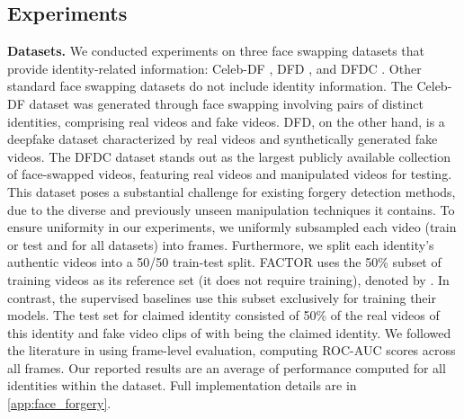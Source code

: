 \documentclass{article} \usepackage{iclr2024_conference,times}
\begin{document}
\vspace{-2em}
\subsection{Experiments}
\textbf{Datasets.} We conducted experiments on three face swapping datasets that provide identity-related information: Celeb-DF \citep{celeb_df}, DFD \citep{dfd}, and DFDC \citep{dfdc}. Other standard face swapping datasets do not include identity information. The Celeb-DF dataset was generated through face swapping involving  pairs of distinct identities, comprising  real videos and  fake videos. DFD, on the other hand, is a deepfake dataset characterized by  real videos and  synthetically generated fake videos. The DFDC dataset stands out as the largest publicly available collection of face-swapped videos, featuring  real videos and  manipulated videos for testing. This dataset poses a substantial challenge for existing forgery detection methods, due to the diverse and previously unseen manipulation techniques it contains. To ensure uniformity in our experiments, we uniformly subsampled each video (train or test and for all datasets) into  frames. Furthermore, we split each identity's authentic videos into a 50/50 train-test split. FACTOR uses the 50\% subset of training videos as its reference set (it does not require training), denoted by . In contrast, the supervised baselines use this subset exclusively for training their models. The test set for claimed identity  consisted of 50\% of the real videos of this identity and fake video clips of with  being the claimed identity. We followed the literature in using frame-level evaluation, computing ROC-AUC scores across all frames. Our reported results are an average of performance computed for all identities within the dataset. Full implementation details are in \cref{app:face_forgery}.
\end{document}
